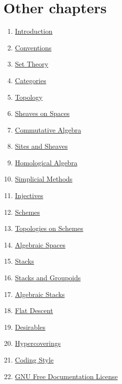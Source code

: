 \section{Other chapters}

\begin{multicols}{2}
\begin{enumerate}
\item \hyperref[introduction-section-overview]{Introduction}
\item \hyperref[conventions-section-comments]{Conventions}
\item \hyperref[sets-section-introduction]{Set Theory}
\item \hyperref[categories-section-introduction]{Categories}
\item \hyperref[topology-section-introduction]{Topology}
\item \hyperref[sheaves-section-introduction]{Sheaves on Spaces}
\item \hyperref[algebra-section-introduction]{Commutative Algebra}
\item \hyperref[sites-section-introduction]{Sites and Sheaves}
\item \hyperref[homology-section-introduction]{Homological Algebra}
\item \hyperref[simplicial-section-introduction]{Simplicial Methods}
\item \hyperref[injectives-section-introduction]{Injectives}
\item \hyperref[schemes-section-introduction]{Schemes}
\item \hyperref[etale-section-introduction]{Topologies on Schemes}
\item \hyperref[spaces-section-introduction]{Algebraic Spaces}
\item \hyperref[stacks-section-introduction]{Stacks}
\item \hyperref[stacks-groupoids-section-introduction]{Stacks and Groupoids}
\item \hyperref[algebraic-section-introduction]{Algebraic Stacks}
\item \hyperref[flat-section-introduction]{Flat Descent}
\item \hyperref[desirables-section-introduction]{Desirables}
\item \hyperref[hypercovering-section-introduction]{Hypercoverings}
\item \hyperref[coding-section-style]{Coding Style}
\item \hyperref[fdl-version]{GNU Free Documentation License}
\end{enumerate}
\end{multicols}

